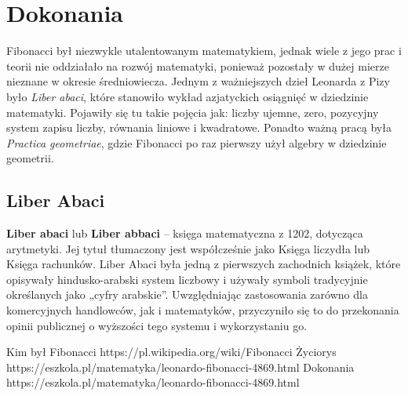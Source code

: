 \documentclass{report}
\begin{document}
\section{Dokonania}
\cite{fib3}
Fibonacci był niezwykle utalentowanym matematykiem, jednak wiele z jego prac i teorii nie oddziałało na rozwój matematyki, ponieważ pozostały w dużej mierze nieznane w okresie średniowiecza.
Jednym z ważniejszych dzieł Leonarda z Pizy było \textit{Liber abaci}, które stanowiło wykład azjatyckich osiągnięć w dziedzinie matematyki. Pojawiły się tu takie pojęcia jak: liczby ujemne, zero, pozycyjny system zapisu liczby, równania liniowe i kwadratowe.
Ponadto ważną pracą była \textit{Practica geometriae}, gdzie Fibonacci po raz pierwszy użył algebry w dziedzinie geometrii.
\subsection{Liber Abaci}
\textbf{Liber abaci} lub \textbf{Liber abbaci} – księga matematyczna z 1202, dotycząca arytmetyki. Jej tytuł tłumaczony jest współcześnie jako Księga liczydła lub Księga rachunków. Liber Abaci była jedną z pierwszych zachodnich książek, które opisywały hindusko-arabski system liczbowy i używały symboli tradycyjnie określanych jako „cyfry arabskie”. Uwzględniając zastosowania zarówno dla komercyjnych handlowców, jak i matematyków, przyczyniło się to do przekonania opinii publicznej o wyższości tego systemu i wykorzystaniu go.
\newpage
\begin{thebibliography}{9}
 Kim był Fibonacci https://pl.wikipedia.org/wiki/Fibonacci
 Życiorys https://eszkola.pl/matematyka/leonardo-fibonacci-4869.html
 Dokonania https://eszkola.pl/matematyka/leonardo-fibonacci-4869.html
\end{thebibliography}
\end{document}
